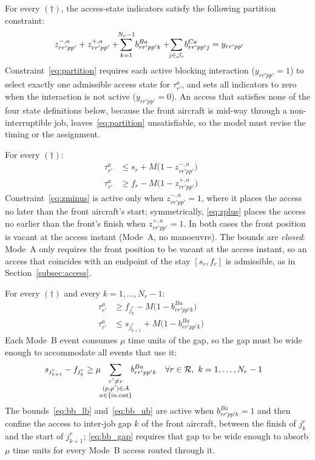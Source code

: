 For every $(\dagger)$, the access-state indicators satisfy the following
partition constraint:
\begin{align}
  z^{-,a}_{rr'pp'} + z^{+,a}_{rr'pp'}
   + \!\!\sum_{k=1}^{N_r-1}\! b^{Ba}_{rr'pp'k}
   + \!\!\sum_{j \in \mathcal{J}_r}\! b^{Ca}_{rr'pp'j}
   &= y_{rr'pp'}
    && \label{eq:partition}
\end{align}
Constraint~\eqref{eq:partition} requires each active blocking
interaction ($y_{rr'pp'} = 1$) to select exactly one admissible access
state for $\tau^a_{r'}$, and sets all indicators to zero when the
interaction is not active ($y_{rr'pp'} = 0$).  An access that satisfies none of the four state
definitions below, because the front aircraft is mid-way through a
non-interruptible job, leaves~\eqref{eq:partition} unsatisfiable, so
the model must revise the timing or the assignment.

For every $(\dagger)$:
\begin{align}
  \tau^a_{r'} &\le s_r + M\bigl(1 - z^{-,a}_{rr'pp'}\bigr)
    && \label{eq:zminus}\\
  \tau^a_{r'} &\ge f_r - M\bigl(1 - z^{+,a}_{rr'pp'}\bigr)
    && \label{eq:zplus}
\end{align}
Constraint~\eqref{eq:zminus} is active only when
$z^{-,a}_{rr'pp'} = 1$, where it places the access no later than the
front aircraft's start; symmetrically, \eqref{eq:zplus} places the
access no earlier than the front's finish when $z^{+,a}_{rr'pp'} = 1$.
In both cases the front position is vacant at the access instant
(Mode~A, no manoeuvre).  The bounds are \emph{closed}: Mode~A only
requires the front position to be vacant at the access instant, so an
access that coincides with an endpoint of the stay $[s_r, f_r]$ is
admissible, as in Section~\ref{subsec:access}.

For every $(\dagger)$ and every $k = 1, \ldots, N_r-1$:
\begin{align}
  \tau^a_{r'} &\ge f_{j^r_k} - M\bigl(1 - b^{Ba}_{rr'pp'k}\bigr)
    && \label{eq:bb_lb}\\
  \tau^a_{r'} &\le s_{j^r_{k+1}} + M\bigl(1 - b^{Ba}_{rr'pp'k}\bigr)
    && \label{eq:bb_ub}
\end{align}
Each Mode~B event consumes $\mu$ time units of the gap, so the gap
must be wide enough to accommodate all events that use it:
\begin{align}
  s_{j^r_{k+1}} - f_{j^r_k}
    &\ge
    \mu \!\!\sum_{\substack{r' \ne r\\ (p,p') \in \mathcal{A} \\ a \in \{\mathrm{in}, \mathrm{out}\}}}
        \!\! b^{Ba}_{rr'pp'k}
    && \forall r \in \mathcal{R},\ k = 1, \ldots, N_r-1
    \label{eq:bb_gap}
\end{align}
The bounds~\eqref{eq:bb_lb} and~\eqref{eq:bb_ub} are active when
$b^{Ba}_{rr'pp'k} = 1$ and then confine the access to inter-job gap $k$
of the front aircraft, between the finish of $j^r_k$ and the start of
$j^r_{k+1}$; \eqref{eq:bb_gap} requires that gap to be wide enough to
absorb $\mu$ time units for every Mode~B access routed through it.

